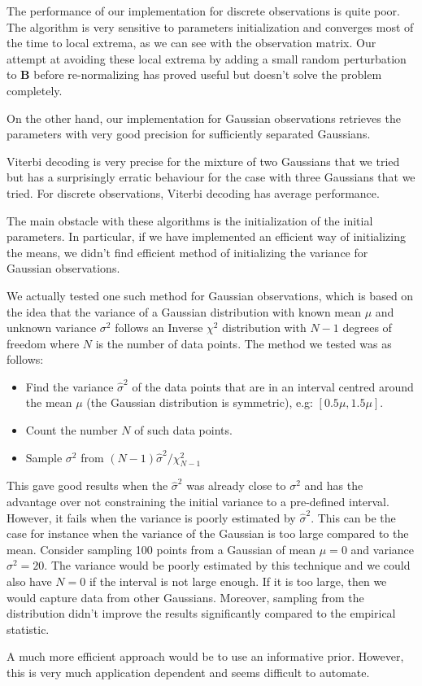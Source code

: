 \documentclass[10pt, a4paper]{article}
\begin{document}
The performance of our implementation for discrete observations is quite poor. The algorithm is very sensitive to parameters initialization and converges most of the time to local extrema, as we can see with the observation matrix. Our attempt at avoiding these local extrema by adding a small random perturbation to $\mathbf{B}$ before re-normalizing has proved useful but doesn't solve the problem completely.

On the other hand, our implementation for Gaussian observations retrieves the parameters with very good precision for sufficiently separated Gaussians.

Viterbi decoding is very precise for the mixture of two Gaussians that we tried but has a surprisingly erratic behaviour for the case with three Gaussians that we tried. For discrete observations, Viterbi decoding has average performance.

The main obstacle with these algorithms is the initialization of the initial parameters. In particular, if we have implemented an efficient way of initializing the means, we didn't find efficient method of initializing the variance for Gaussian observations.

We actually tested one such method for Gaussian observations, which is based on the idea that the variance of a Gaussian distribution with known mean $\mu$ and unknown variance $\sigma^2$ follows an Inverse $\chi^2$ distribution with $N-1$ degrees of freedom where $N$ is the number of data points. The method we tested was as follows:
\begin{itemize}
\item Find the variance $\hat{\sigma}^2$ of the data points that are in an interval centred around the mean $\mu$ (the Gaussian distribution is symmetric), e.g: $[0.5 \mu, 1.5\mu]$.
\item Count the number $N$ of such data points.
\item Sample $\sigma^2$ from $(N-1) \hat{\sigma}^2 / \chi^2_{N-1}$
\end{itemize}
This gave good results when the $\hat{\sigma}^2$ was already close to $\sigma^2$ and has the advantage over not constraining the initial variance to a pre-defined interval. However, it fails when the variance is poorly estimated by $\hat{\sigma}^2$. This can be the case for instance when the variance of the Gaussian is too large compared to the mean. Consider sampling 100 points from a Gaussian of mean $\mu = 0$ and variance $\sigma^2 = 20$. The variance would be poorly estimated by this technique and we could also have $N = 0$ if the interval is not large enough. If it is too large, then we would capture data from other Gaussians. Moreover, sampling from the distribution didn't improve the results significantly compared to the empirical statistic.

A much more efficient approach would be to use an informative prior. However, this is very much application dependent and seems difficult to automate.
\end{document}
